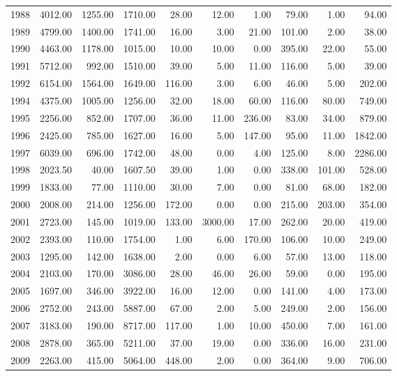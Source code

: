 \begin{table}
{\begin{tabular}{rrrrrrrrrr}
  1988 & 4012.00 & 1255.00 & 1710.00 & 28.00 & 12.00 & 1.00 & 79.00 & 1.00 & 94.00 \\ 
  1989 & 4799.00 & 1400.00 & 1741.00 & 16.00 & 3.00 & 21.00 & 101.00 & 2.00 & 38.00 \\ 
  1990 & 4463.00 & 1178.00 & 1015.00 & 10.00 & 10.00 & 0.00 & 395.00 & 22.00 & 55.00 \\ 
  1991 & 5712.00 & 992.00 & 1510.00 & 39.00 & 5.00 & 11.00 & 116.00 & 5.00 & 39.00 \\ 
  1992 & 6154.00 & 1564.00 & 1649.00 & 116.00 & 3.00 & 6.00 & 46.00 & 5.00 & 202.00 \\ 
  1994 & 4375.00 & 1005.00 & 1256.00 & 32.00 & 18.00 & 60.00 & 116.00 & 80.00 & 749.00 \\ 
  1995 & 2256.00 & 852.00 & 1707.00 & 36.00 & 11.00 & 236.00 & 83.00 & 34.00 & 879.00 \\ 
  1996 & 2425.00 & 785.00 & 1627.00 & 16.00 & 5.00 & 147.00 & 95.00 & 11.00 & 1842.00 \\ 
  1997 & 6039.00 & 696.00 & 1742.00 & 48.00 & 0.00 & 4.00 & 125.00 & 8.00 & 2286.00 \\ 
  1998 & 2023.50 & 40.00 & 1607.50 & 39.00 & 1.00 & 0.00 & 338.00 & 101.00 & 528.00 \\ 
  1999 & 1833.00 & 77.00 & 1110.00 & 30.00 & 7.00 & 0.00 & 81.00 & 68.00 & 182.00 \\ 
  2000 & 2008.00 & 214.00 & 1256.00 & 172.00 & 0.00 & 0.00 & 215.00 & 203.00 & 354.00 \\ 
  2001 & 2723.00 & 145.00 & 1019.00 & 133.00 & 3000.00 & 17.00 & 262.00 & 20.00 & 419.00 \\ 
  2002 & 2393.00 & 110.00 & 1754.00 & 1.00 & 6.00 & 170.00 & 106.00 & 10.00 & 249.00 \\ 
  2003 & 1295.00 & 142.00 & 1638.00 & 2.00 & 0.00 & 6.00 & 57.00 & 13.00 & 118.00 \\ 
  2004 & 2103.00 & 170.00 & 3086.00 & 28.00 & 46.00 & 26.00 & 59.00 & 0.00 & 195.00 \\ 
  2005 & 1697.00 & 346.00 & 3922.00 & 16.00 & 12.00 & 0.00 & 141.00 & 4.00 & 173.00 \\ 
  2006 & 2752.00 & 243.00 & 5887.00 & 67.00 & 2.00 & 5.00 & 249.00 & 2.00 & 156.00 \\ 
  2007 & 3183.00 & 190.00 & 8717.00 & 117.00 & 1.00 & 10.00 & 450.00 & 7.00 & 161.00 \\ 
  2008 & 2878.00 & 365.00 & 5211.00 & 37.00 & 19.00 & 0.00 & 336.00 & 16.00 & 231.00 \\ 
  2009 & 2263.00 & 415.00 & 5064.00 & 448.00 & 2.00 & 0.00 & 364.00 & 9.00 & 706.00 \\ 

\end{tabular}}
\end{table}
